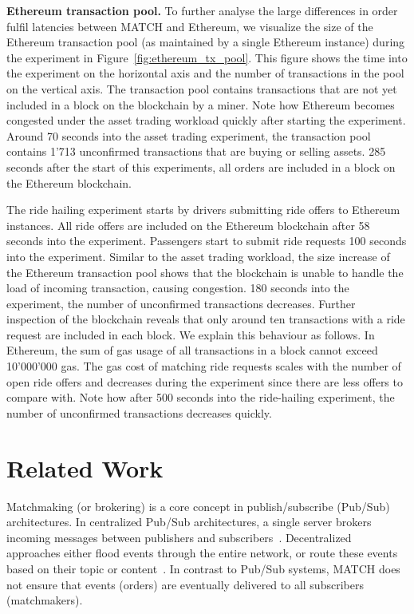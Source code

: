 \textbf{Ethereum transaction pool.}
To further analyse the large differences in order fulfil latencies between MATCH and Ethereum, we visualize the size of the Ethereum transaction pool (as maintained by a single Ethereum instance) during the experiment in Figure~\ref{fig:ethereum_tx_pool}.
This figure shows the time into the experiment on the horizontal axis and the number of transactions in the pool on the vertical axis.
The transaction pool contains transactions that are not yet included in a block on the blockchain by a miner.
Note how Ethereum becomes congested under the asset trading workload quickly after starting the experiment.
Around 70 seconds into the asset trading experiment, the transaction pool contains 1'713 unconfirmed transactions that are buying or selling assets.
285 seconds after the start of this experiments, all orders are included in a block on the Ethereum blockchain.

The ride hailing experiment starts by drivers submitting ride offers to Ethereum instances.
All ride offers are included on the Ethereum blockchain after 58 seconds into the experiment.
Passengers start to submit ride requests 100 seconds into the experiment.
Similar to the asset trading workload, the size increase of the Ethereum transaction pool shows that the blockchain is unable to handle the load of incoming transaction, causing congestion.
180 seconds into the experiment, the number of unconfirmed transactions decreases.
Further inspection of the blockchain reveals that only around ten transactions with a ride request are included in each block.
We explain this behaviour as follows.
In Ethereum, the sum of gas usage of all transactions in a block cannot exceed 10'000'000 gas.
The gas cost of matching ride requests scales with the number of open ride offers and decreases during the experiment since there are less offers to compare with.
Note how after 500 seconds into the ride-hailing experiment, the number of unconfirmed transactions decreases quickly.


\section{Related Work}
Matchmaking (or brokering) is a core concept in publish/subscribe (Pub/Sub) architectures.
In centralized Pub/Sub architectures, a single server brokers incoming messages between publishers and subscribers~\cite{Carzaniga2001DesignAE}.
Decentralized approaches either flood events through the entire network, or route these events based on their topic or content~\cite{banavar1999efficient,carzaniga2004routing}.
In contrast to Pub/Sub systems, MATCH does not ensure that events (orders) are eventually delivered to all subscribers (matchmakers).

